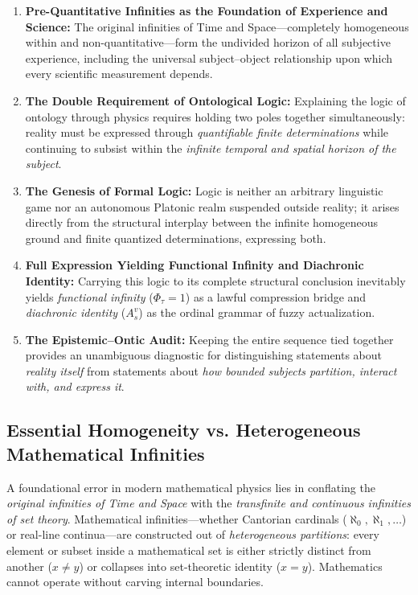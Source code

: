 \documentclass[11pt,a4paper]{article}
\begin{document}
\begin{enumerate}[label=\textbf{\arabic*.}]
    \item \textbf{Pre-Quantitative Infinities as the Foundation of Experience and Science:} The original infinities of Time and Space—completely homogeneous within and non-quantitative—form the undivided horizon of all subjective experience, including the universal subject--object relationship upon which every scientific measurement depends.
    \item \textbf{The Double Requirement of Ontological Logic:} Explaining the logic of ontology through physics requires holding two poles together simultaneously: reality must be expressed through \emph{quantifiable finite determinations} while continuing to subsist within the \emph{infinite temporal and spatial horizon of the subject}.
    \item \textbf{The Genesis of Formal Logic:} Logic is neither an arbitrary linguistic game nor an autonomous Platonic realm suspended outside reality; it arises directly from the structural interplay between the infinite homogeneous ground and finite quantized determinations, expressing both.
    \item \textbf{Full Expression Yielding Functional Infinity and Diachronic Identity:} Carrying this logic to its complete structural conclusion inevitably yields \emph{functional infinity} ($\Phi_\tau = 1$) as a lawful compression bridge and \emph{diachronic identity} ($A_s^v$) as the ordinal grammar of fuzzy actualization.
    \item \textbf{The Epistemic--Ontic Audit:} Keeping the entire sequence tied together provides an unambiguous diagnostic for distinguishing statements about \emph{reality itself} from statements about \emph{how bounded subjects partition, interact with, and express it}.
\end{enumerate}

\subsection{Essential Homogeneity vs. Heterogeneous Mathematical Infinities}

A foundational error in modern mathematical physics lies in conflating the \emph{original infinities of Time and Space} with the \emph{transfinite and continuous infinities of set theory}. Mathematical infinities—whether Cantorian cardinals ($\aleph_0, \aleph_1, \dots$) or real-line continua—are constructed out of \emph{heterogeneous partitions}: every element or subset inside a mathematical set is either strictly distinct from another ($x \neq y$) or collapses into set-theoretic identity ($x = y$). Mathematics cannot operate without carving internal boundaries.
\end{document}
